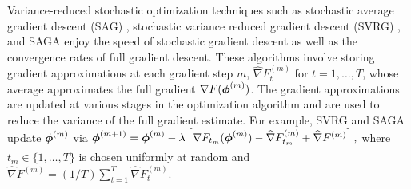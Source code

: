 Variance-reduced stochastic optimization techniques such as stochastic average gradient descent (SAG) \citep{Schmidt:2017}, stochastic variance reduced gradient descent (SVRG) \citep{Johnson:2013}, and SAGA \citep{Defazio:2014} enjoy the speed of stochastic gradient descent as well as the convergence rates of full gradient descent. These algorithms involve storing gradient approximations at each gradient step $m$, $\widehat \nabla F_{t}^{(m)}$ for $t = 1,\ldots,T$, whose average approximates the full gradient $\nabla F(\boldsymbol{\phi}^{(m)})$. The gradient approximations are updated at various stages in the optimization algorithm and are used to reduce the variance of the full gradient estimate. 
%
%
For example, SVRG and SAGA update $\boldsymbol{\phi}^{(m)}$ via
%
    $\boldsymbol{\phi}^{(m+1)} = \boldsymbol{\phi}^{(m)} - \lambda \left[\nabla F_{t_m}(\boldsymbol{\phi}^{(m)}) - \widehat \nabla F_{t_m}^{(m)} + \widehat \nabla F^{(m)} \right],$
%
where $t_m \in \{1,\ldots,T\}$ is chosen uniformly at random and
%
    $\widehat \nabla F^{(m)} = (1/T) \sum_{t=1}^T \widehat \nabla F_{t}^{(m)}$.
%
